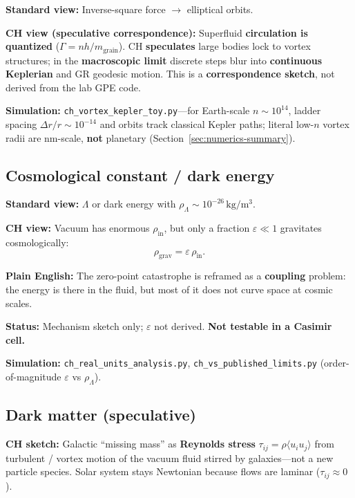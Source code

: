 \documentclass[11pt,a4paper]{article}
\begin{document}
\textbf{Standard view:} Inverse-square force $\to$ elliptical orbits.

\textbf{CH view (speculative correspondence):} Superfluid \textbf{circulation is quantized} ($\Gamma = nh/m_{\mathrm{grain}}$).
CH \textbf{speculates} large bodies lock to vortex structures; in the \textbf{macroscopic limit} discrete steps blur into \textbf{continuous Keplerian} and GR geodesic motion.
This is a \textbf{correspondence sketch}, not derived from the lab GPE code.

\textbf{Simulation:} \texttt{ch\_vortex\_kepler\_toy.py}---for Earth-scale $n \sim 10^{14}$, ladder spacing $\Delta r/r \sim 10^{-14}$ and orbits track classical Kepler paths; literal low-$n$ vortex radii are nm-scale, \textbf{not} planetary (Section~\ref{sec:numerics-summary}).

\subsection{Cosmological constant / dark energy}

\textbf{Standard view:} $\Lambda$ or dark energy with $\rho_\Lambda \sim 10^{-26}\,\si{\kilogram\per\meter\cubed}$.

\textbf{CH view:} Vacuum has enormous $\rho_{\mathrm{in}}$, but only a fraction \textbf{$\varepsilon \ll 1$} gravitates cosmologically:
\begin{equation}
  \rho_{\mathrm{grav}} = \varepsilon\,\rho_{\mathrm{in}}.
\end{equation}

\textbf{Plain English:} The zero-point catastrophe is reframed as a \textbf{coupling} problem: the energy is there in the fluid, but most of it does not curve space at cosmic scales.

\textbf{Status:} Mechanism sketch only; $\varepsilon$ not derived.
\textbf{Not testable in a Casimir cell.}

\textbf{Simulation:} \texttt{ch\_real\_units\_analysis.py}, \texttt{ch\_vs\_published\_limits.py} (order-of-magnitude $\varepsilon$ vs $\rho_\Lambda$).

\subsection{Dark matter (speculative)}

\textbf{CH sketch:} Galactic ``missing mass'' as \textbf{Reynolds stress} $\tau_{ij} = \rho\langle u_i u_j\rangle$ from turbulent / vortex motion of the vacuum fluid stirred by galaxies---not a new particle species.
Solar system stays Newtonian because flows are laminar ($\tau_{ij} \approx 0$).
\end{document}
